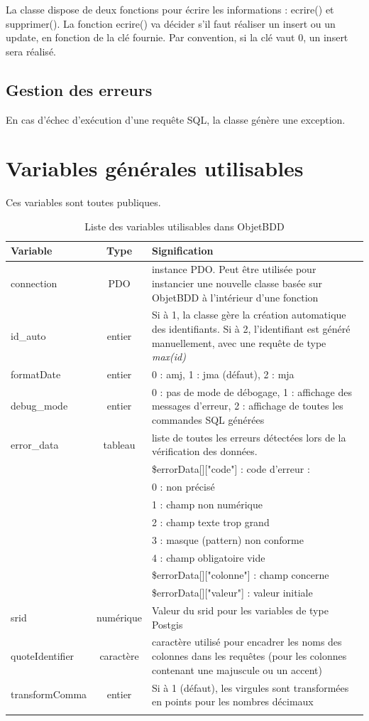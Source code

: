 La classe dispose de deux fonctions pour écrire les informations : ecrire() et supprimer(). La fonction ecrire() va décider s'il faut réaliser un insert ou un update, en fonction de la clé fournie. Par convention, si la clé vaut 0, un insert sera réalisé.

\subsection{Gestion des erreurs}

En cas d'échec d'exécution d'une requête SQL, la classe génère une exception.

\section{Variables générales utilisables}

Ces variables sont toutes publiques.
\begin{longtable}{|p{3cm}|c|p{8.5cm}|}
\hline
\textbf{Variable} & \textbf{Type} & \textbf{Signification} \\
\hline
\endhead
connection & PDO & instance PDO. Peut être utilisée pour instancier une nouvelle classe basée sur ObjetBDD à l'intérieur d'une fonction \\
\hline
id\_auto & entier & Si à 1, la classe gère la création automatique des identifiants. Si à 2, l'identifiant est généré manuellement, avec une requête de type \textit{max(id)} \\
\hline
formatDate & entier & 0 : amj, 1 : jma (défaut), 2 : mja \\
\hline
debug\_mode & entier & 0 : pas de mode de débogage, 1 : affichage des messages d'erreur, 2 : affichage de toutes les commandes SQL générées
\\
\hline
error\_data & tableau & liste de toutes les erreurs détectées lors de la vérification des données.  \\
 & & \$errorData[]["code"] : code d'erreur : \\
	& & 0 : non précisé \\
	& & 1 : champ non numérique \\
	& & 2 : champ texte trop grand \\
	& & 3 : masque (pattern) non conforme \\
	& & 4 : champ obligatoire vide \\
	& & \$errorData[]["colonne"] : champ concerne \\
	& & \$errorData[]["valeur"] : valeur initiale \\
\hline
srid & numérique & Valeur du srid pour les variables de type Postgis \\
\hline
quoteIdentifier & caractère & caractère utilisé pour encadrer les noms des colonnes dans les requêtes (pour les colonnes contenant une majuscule ou un accent) \\
\hline
transformComma & entier & Si à 1 (défaut), les virgules sont transformées en points pour les nombres décimaux \\
\hline

\caption{Liste des variables utilisables dans ObjetBDD}

\end{longtable}

